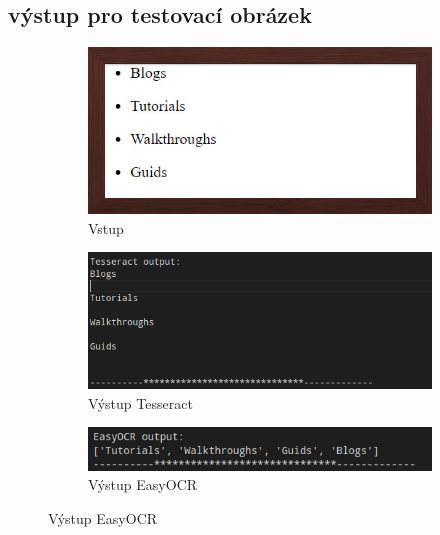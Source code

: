 \documentclass[journal]{IEEEtran}
\begin{document}
\subsection{výstup pro testovací obrázek}

\begin{figure}

\begin{subfigure}{\linewidth}
        \centering
        \includegraphics[width=\linewidth]{Images/Test.jpg}
        \caption{Vstup}
        \label{fig:Test}
\end{subfigure}

\begin{subfigure}{\linewidth}
        \centering
        \includegraphics[width=\linewidth]{Images/Tesseract_Test.png}
        \caption{Výstup Tesseract}
        \label{fig:Tesseract_Test}
\end{subfigure}

\begin{subfigure}{\linewidth}
        \centering
        \includegraphics[width=\linewidth]{Images/easyOCR_Test.png}
        \caption{Výstup EasyOCR}
        \label{fig:easyOCR_Test}
\end{subfigure}


\end{figure}
\end{document}
